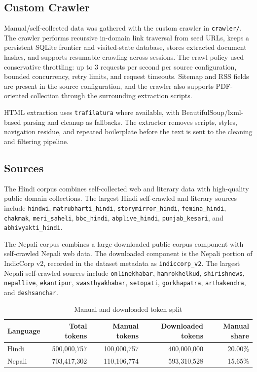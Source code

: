 \documentclass[11pt]{article}
\begin{document}
\subsection{Custom Crawler}
Manual/self-collected data was gathered with the custom crawler in
\texttt{crawler/}. The crawler performs recursive in-domain link traversal
from seed URLs, keeps a persistent SQLite frontier and visited-state database,
stores extracted document hashes, and supports resumable crawling across
sessions. The crawl policy used conservative throttling: up to 3 requests per
second per source configuration, bounded concurrency, retry limits, and
request timeouts. Sitemap and RSS fields are present in the source
configuration, and the crawler also supports PDF-oriented collection through
the surrounding extraction scripts.

HTML extraction uses \texttt{trafilatura} where available, with
BeautifulSoup/lxml-based parsing and cleanup as fallbacks. The extractor
removes scripts, styles, navigation residue, and repeated boilerplate before
the text is sent to the cleaning and filtering pipeline.

\subsection{Sources}
The Hindi corpus combines self-collected web and literary data with high-quality public domain collections. The largest Hindi self-crawled and literary sources include \texttt{hindwi}, \texttt{matrubharti\_hindi},
\texttt{storymirror\_hindi}, \texttt{femina\_hindi}, \texttt{chakmak},
\texttt{meri\_saheli}, \texttt{bbc\_hindi}, \texttt{abplive\_hindi},
\texttt{punjab\_kesari}, and \texttt{abhivyakti\_hindi}.

The Nepali corpus combines a large downloaded public corpus component with
self-crawled Nepali web data. The downloaded component is the Nepali portion
of IndicCorp v2, recorded in the dataset metadata as
\texttt{indiccorp\_v2}. The largest Nepali self-crawled sources include
\texttt{onlinekhabar}, \texttt{hamrokhelkud}, \texttt{shirishnews},
\texttt{nepallive}, \texttt{ekantipur}, \texttt{swasthyakhabar},
\texttt{setopati}, \texttt{gorkhapatra}, \texttt{arthakendra}, and
\texttt{deshsanchar}.

\begin{table}[H]
\centering
\caption{Manual and downloaded token split}
\begin{tabular}{lrrrr}
\toprule
Language & Total tokens & Manual tokens & Downloaded tokens & Manual share \\
\midrule
Hindi & 500,000,757 & 100,000,757 & 400,000,000 & 20.00\% \\
Nepali & 703,417,302 & 110,106,774 & 593,310,528 & 15.65\% \\
\bottomrule
\end{tabular}
\end{table}
\end{document}
